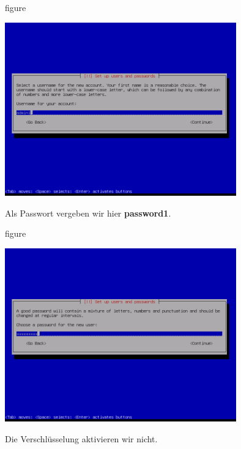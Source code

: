 \begin{nofloat}{figure}
\begin{center}
\includegraphics[width=0.75\textwidth]{screenshots/28_ubuntu_install.png}
\end{center}
\end{nofloat}
\newpage
Als Passwort vergeben wir hier \textbf{password1}.

\begin{nofloat}{figure}
\begin{center}
\includegraphics[width=0.75\textwidth]{screenshots/29_ubuntu_install.png}
\end{center}
\end{nofloat}

Die Verschlüsselung aktivieren wir nicht.

